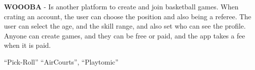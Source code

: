 \textbf{WOOOBA}\cite{woooba} - Is another platform to create and join basketball games.
When crating an account, the user can choose the position and also being a referee.
The user can select the age, and the skill range, and also set who can see the profile.
Anyone can create games, and they can be free or paid, and the app takes a fee when it is paid.

``Pick-Roll''\cite{pick-roll}
``AirCourts''\cite{aircourts},
``Playtomic''\cite{playtonic}














































